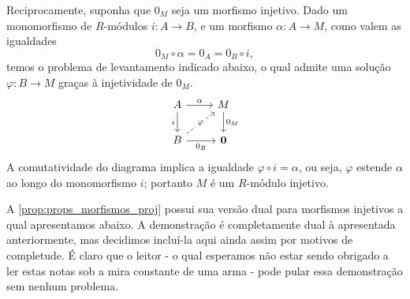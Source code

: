 \begin{exem}
  Reciprocamente, suponha que $0_M$ seja um morfismo injetivo.
  Dado um monomorfismo de $R$-módulos $i: A \to B$, e um morfismo $\alpha: A \to M$, como valem as igualdades
  \begin{displaymath}
    0_M \circ \alpha = 0_A = 0_B \circ i,
  \end{displaymath}
  temos o problema de levantamento indicado abaixo, o qual admite uma solução $\varphi: B \to M$ graças à injetividade de $0_M$.
  \begin{displaymath}
    \begin{tikzcd}
      A
      \arrow[r, "\alpha"]
      \arrow[d, "i" swap]
      & M
      \arrow[d, "0_M"]
      \\ B
      \arrow[r, "0_B" swap]
      \arrow[ru, dashed, "\varphi" description]
      & \mathbf{0}
    \end{tikzcd}
  \end{displaymath}
  A comutatividade do diagrama implica a igualdade $\varphi \circ i = \alpha$, ou seja, $\varphi$ estende $\alpha$ ao longo do monomorfismo $i$; portanto $M$ é um $R$-módulo injetivo.
\end{exem}

A \cref{prop:props_morfismos_proj} possui sua versão dual para morfismos injetivos a qual apresentamos abaixo.
A demonstração é completamente dual à apresentada anteriormente, mas decidimos incluí-la aqui ainda assim por motivos de completude.
É claro que o leitor -  o qual esperamos não estar sendo obrigado a ler estas notas sob a mira constante de uma arma - pode pular essa demonstração sem nenhum problema.

